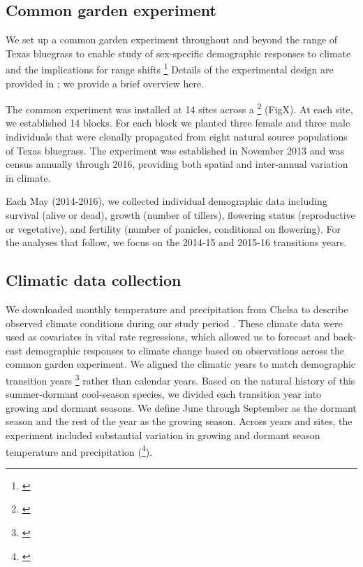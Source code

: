 \documentclass[11pt]{article}\usepackage[]{graphicx}\usepackage[usenames,dvipsnames]{xcolor}
\newcommand{\tom}[2]{{\color{red}{#1}}\footnote{\textit{\color{red}{#2}}}}
\begin{document}
\subsection*{Common garden experiment}
We set up a common garden experiment throughout and beyond the range of Texas bluegrass to enable study of sex-specific demographic responses to climate and the implications for range shifts \tom{\citep{merow2017climate,schwinning2022common}. }{I am not sure why you cite these studies here. They would be more appropriate for the Intro if you expand the paragraph about mechanistic modeling.}
Details of the experimental design are provided in \cite{miller2022two}; we provide a brief overview here. 

The common experiment was installed at 14 sites across a \tom{precipitation gradient}{While the Am Nat paper focused on precipitation, the actual design spans both temperature and precip, whch is a feature you can exploit for your analysis, and would be worth highlighting as a source of novelty of this paper relative to the previous one. Some reviewers will be skeptical that we are publishing another paper from the same experiment, so the distinction should be made clear.} (FigX). 
At each site, we established 14 blocks. 
For each block we planted three female and three male individuals that were clonally propagated from eight natural source populations of Texas bluegrass. 
The experiment was established in November 2013 and was census annually through 2016, providing both spatial and inter-annual variation in climate. 

Each May (2014-2016), we collected individual demographic data including survival (alive or dead), growth (number of tillers), flowering status (reproductive or vegetative), and fertility (number of panicles, conditional on flowering). 
For the analyses that follow, we focus on the 2014-15 and 2015-16 transitions years.

\subsection*{Climatic data collection}
We downloaded monthly temperature and precipitation from Chelsa to describe observed climate conditions during our study period \citep{karger2017climatologies}.
These climate data were used as covariates in vital rate regressions, which allowed us to forecast and back-cast demographic responses to climate change based on observations across the common garden experiment. 
We aligned the climatic years to match demographic transition years \tom{(May 1 -- April 30)}{I am not sure if these are actually the right dates.} rather than calendar years.
Based on the natural history of this summer-dormant cool-season species, we divided each transition year into growing and dormant seasons. 
We define June through September as the dormant season and the rest of the year as the growing season. 
Across years and sites, the experiment included substantial variation in growing and dormant season temperature and precipitation (\tom{Figure}{I think we should have a figure, maybe just for the appendix, that visualizes this.}).
\end{document}
